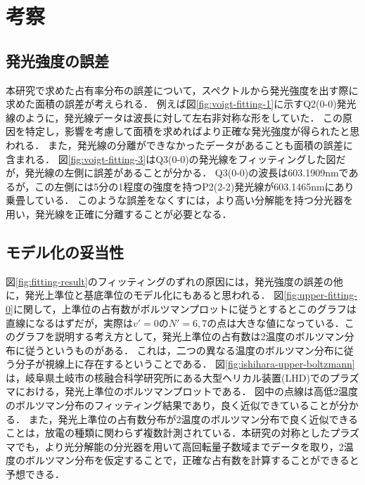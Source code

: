 \chapter{考察}

\section{発光強度の誤差}
本研究で求めた占有率分布の誤差について，スペクトルから発光強度を出す際に求めた面積の誤差が考えられる．
例えば図\ref{fig:voigt-fitting-1}に示すQ2(0-0)発光線のように，発光線データは波長に対して左右非対称な形をしていた．
この原因を特定し，影響を考慮して面積を求めればより正確な発光強度が得られたと思われる．
また，発光線の分離ができなかったデータがあることも面積の誤差に含まれる．
図\ref{fig:voigt-fitting-3}はQ3(0-0)の発光線をフィッティングした図だが，発光線の左側に誤差があることが分かる．
Q3(0-0)の波長は603.1909nmであるが，この左側には5分の1程度の強度を持つP2(2-2)発光線が603.1465nmにあり乗畳している\cite{kyokaisou}．
このような誤差をなくすには，より高い分解能を持つ分光器を用い，発光線を正確に分離することが必要となる．

\section{モデル化の妥当性}
図\ref{fig:fitting-result}のフィッティングのずれの原因には，発光強度の誤差の他に，発光上準位と基底準位のモデル化にもあると思われる．
図\ref{fig:upper-fitting-0}に関して，上準位の占有数がボルツマンプロットに従うとするとこのグラフは直線になるはずだが，実際は$v'=0$の$N'=6,7$の点は大きな値になっている．このグラフを説明する考え方として，発光上準位の占有数は2温度のボルツマン分布に従うというものがある．
これは，二つの異なる温度のボルツマン分布に従う分子が視線上に存在するということである．
図\ref{fig:ishihara-upper-boltzmann}は，岐阜県土岐市の核融合科学研究所にある大型ヘリカル装置(LHD)でのプラズマにおける，発光上準位のボルツマンプロットである\cite{ishihara}．
図中の点線は高低2温度のボルツマン分布のフィッティング結果であり，良く近似できていることが分かる．
また，発光上準位の占有数分布が2温度のボルツマン分布で良く近似できることは，放電の種類に関わらず複数計測されている\cite{ishihara, two-temperature-1, two-temperature-2}．本研究の対称としたプラズマでも，より光分解能の分光器を用いて高回転量子数域までデータを取り，2温度のボルツマン分布を仮定することで，正確な占有数を計算することができると予想できる．